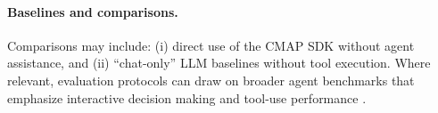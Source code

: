 \paragraph{Baselines and comparisons.}
Comparisons may include: (i) direct use of the CMAP SDK without agent assistance, and (ii) ``chat-only'' LLM baselines without tool execution.
Where relevant, evaluation protocols can draw on broader agent benchmarks that emphasize interactive decision making \citep{Liu2023AgentBench} and tool-use performance \citep{Qin2023ToolLLM,Guo2024StableToolBench}.
